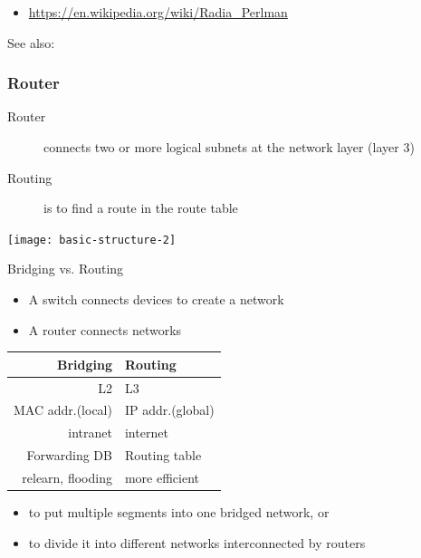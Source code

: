 \begin{itemize}
\item \url{https://en.wikipedia.org/wiki/Radia_Perlman}
\end{itemize}

See also: 

\subsubsection{Router}

\begin{frame}
  \begin{minipage}{.7\columnwidth}
    \begin{description}
    \item[Router] connects two or more logical subnets at the network layer (layer 3)
    \item[Routing] is to find a route in the route table
    \end{description}
  \end{minipage}\hfill
  \begin{minipage}{.29\columnwidth}
    \begin{center}
      \texttt{[image: basic-structure-2]}
    \end{center}
  \end{minipage}
\end{frame}

\begin{frame}
  \begin{iblock}{Bridging vs. Routing}
    \begin{itemize}
    \item A switch connects devices to create a network
    \item A router connects networks
    \end{itemize}
    \begin{center}
      \begin{tabular}{r|l}\toprule
        \textbf{Bridging}&\textbf{Routing}\\\midrule
        L2&L3\\
        MAC addr.(local)&IP addr.(global)\\
        intranet&internet\\
        Forwarding DB&Routing table\\
        relearn, flooding&more efficient\\\bottomrule
      \end{tabular}
    \end{center}
  \end{iblock}
  \begin{itemize}
  \item to put multiple segments into one bridged network, or
  \item to divide it into different networks interconnected by routers
  \end{itemize}
\end{frame}

